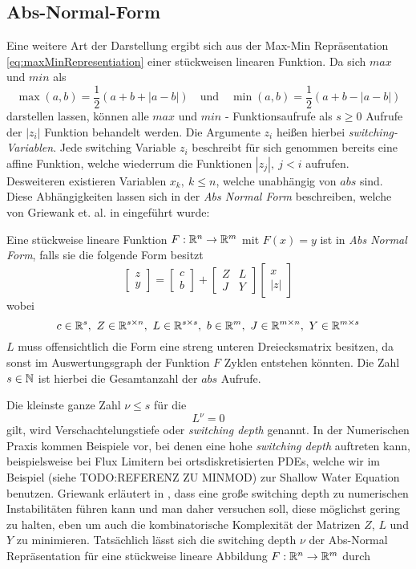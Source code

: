 \subsection{Abs-Normal-Form}
\label{sec:absNormalForm}
Eine weitere Art der Darstellung ergibt sich aus der Max-Min Repräsentation \eqref{eq:maxMinRepresentiation} einer stückweisen linearen Funktion.
Da sich $max$ und $min$ als
\[
\max(a,b) = \frac{1}{2}(a+b + |a-b|)\quad \text{und} \quad \min(a,b) = \frac{1}{2}(a+b - |a-b|)
\]
darstellen lassen, können alle $max$ und $min$ - Funktionsaufrufe als $s\geq 0$ Aufrufe der $|z_i|$ Funktion behandelt werden. Die Argumente $z_i$ heißen hierbei \textit{switching-Variablen}. Jede switching Variable $z_i$ beschreibt für sich genommen bereits eine affine Funktion, welche wiederrum die Funktionen $|z_j|, ~j<i$ aufrufen. Desweiteren existieren Variablen $x_k, ~k\leq n$, welche unabhängig von $abs$ sind. Diese Abhängigkeiten lassen sich in der \textit{Abs Normal Form} beschreiben, welche von Griewank et. al. in \cite{plan} eingeführt wurde:
\begin{definition}
 Eine stückweise lineare Funktion $F:\mathbb{R}^n\to \mathbb{R}^m$ mit $F(x) = y$ ist in \textit{Abs Normal Form}, falls sie die folgende Form besitzt
 \[
  \begin{bmatrix}
   z\\y
  \end{bmatrix}
  =
  \begin{bmatrix}
   c\\b
  \end{bmatrix}
  +
  \begin{bmatrix}
   Z & L\\
   J & Y
  \end{bmatrix}
  \begin{bmatrix}
   x\\|z|
  \end{bmatrix}
 \]
wobei 
\[
c\in \mathbb{R}^s, ~ Z\in \mathbb{R}^{s\times n},~ L\in\mathbb{R}^{s\times s}, ~ b\in\mathbb{R}^m, ~ J\in\mathbb{R}^{m\times n}, ~ Y\in \mathbb{R}^{m\times s} 
\]
$L$ muss offensichtlich die Form eine streng unteren Dreiecksmatrix besitzen, da sonst im Auswertungsgraph der Funktion $F$ Zyklen entstehen könnten. Die Zahl $s\in \mathbb{N}$ ist hierbei die Gesamtanzahl der $abs$ Aufrufe.
\end{definition}
Die kleinste ganze Zahl $\nu \leq s$ für die 
\[
 L^\nu =0
\]
gilt, wird Verschachtelungstiefe oder \textit{switching depth} genannt. 
In der Numerischen Praxis kommen Beispiele vor, bei denen eine hohe \textit{switching depth} auftreten kann, beispielsweise bei Flux Limitern bei ortsdiskretisierten PDEs, welche wir im Beispiel (siehe TODO:REFERENZ ZU MINMOD) zur Shallow Water Equation benutzen. Griewank erläutert in \cite{monster}, dass eine große switching depth zu numerischen Instabilitäten führen kann und man daher versuchen soll, diese möglichst gering zu halten, eben um auch die kombinatorische Komplexität der Matrizen $Z$, $L$ und $Y$ zu minimieren. Tatsächlich lässt sich die switching depth $\nu$ der Abs-Normal Repräsentation für eine stückweise lineare Abbildung $F:\mathbb{R}^n\to\mathbb{R}^m$ durch 
